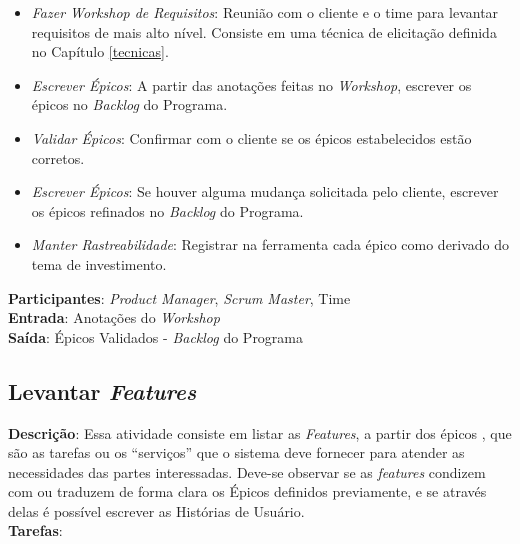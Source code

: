   \begin{itemize}
   \item \indent \textit{Fazer Workshop de Requisitos}: Reunião com o cliente e o time para levantar requisitos de mais alto nível. Consiste
   em uma técnica de elicitação definida no Capítulo \ref{tecnicas}.

   \item \indent \textit{Escrever Épicos}: A partir das anotações feitas no \textit{Workshop},
   escrever os épicos no \textit{Backlog} do Programa.
   
   \item \indent \textit{Validar Épicos}: Confirmar com o cliente se os épicos estabelecidos estão corretos.

   \item \indent \textit{Escrever Épicos}: Se houver alguma mudança solicitada pelo cliente, escrever os épicos
   refinados no \textit{Backlog} do Programa.
   
   \item \indent \textit{Manter Rastreabilidade}: Registrar na ferramenta cada épico como derivado do tema de investimento.

  \end{itemize}

  \textbf{Participantes}: \textit{Product Manager}, \textit{Scrum Master}, Time \\

  \textbf{Entrada}: Anotações do \textit{Workshop} \\

  \textbf{Saída}: Épicos Validados - \textit{Backlog} do Programa\\

\subsection{Levantar \textit{Features}}
\textbf{Descrição}: Essa atividade consiste em listar as \textit{Features}, a partir dos épicos ,
que são as tarefas ou os “serviços” que o sistema deve fornecer para atender as necessidades das partes interessadas.
Deve-se observar se as \textit{features} condizem com ou traduzem de forma clara os Épicos
definidos previamente, e se através delas é possível escrever as Histórias de Usuário.\\

\textbf{Tarefas}:

